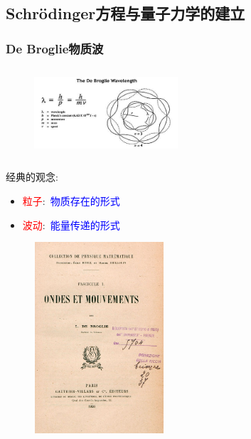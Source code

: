\subsection{\textrm{Schr\"odinger}方程与量子力学的建立}
\frame
{
	\frametitle{\textrm{De Broglie}物质波}
\begin{minipage}{0.53\textwidth}
\begin{figure}[h!]
\centering
\vspace{-15.5pt}
\includegraphics[height=1.3in,width=2.1in,viewport=0 0 500 280,clip]{Figures/De-Broglie-waves.jpg}
\label{Matter_wave}
\end{figure}
经典的观念:
\begin{itemize}
	\item \textcolor{red}{粒子}:~\textcolor{blue}{物质存在的形式}
	\item \textcolor{red}{波动}:~\textcolor{blue}{能量传递的形式}
\end{itemize}
\end{minipage}
\begin{minipage}{0.45\textwidth}
\begin{figure}[h!]
\centering
\vspace{-15.5pt}
\includegraphics[height=2.80in,width=1.90in,viewport=0 0 430 650,clip]{Figures/De_Broglie-dissertation_Cover.jpg}
\label{De_Broglie-dissertation}
\end{figure}
\end{minipage}
}

